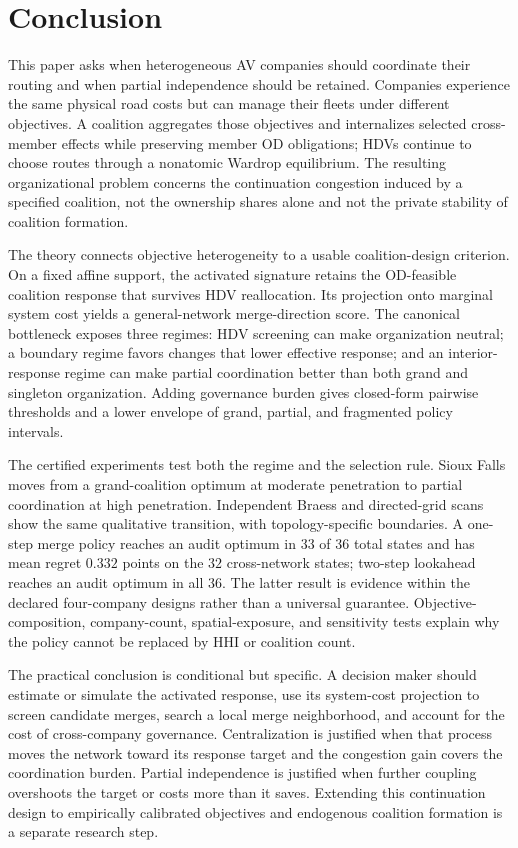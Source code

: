 \section{Conclusion}\label{sec:conclusion}

This paper asks when heterogeneous AV companies should coordinate their
routing and when partial independence should be retained. Companies experience
the same physical road costs but can manage their fleets under different
objectives. A coalition aggregates those objectives and internalizes selected
cross-member effects while preserving member OD obligations; HDVs continue to
choose routes through a nonatomic Wardrop equilibrium. The resulting
organizational problem concerns the continuation congestion induced by a
specified coalition, not the ownership shares alone and not the private
stability of coalition formation.

The theory connects objective heterogeneity to a usable coalition-design
criterion. On a fixed affine support, the activated signature retains the
OD-feasible coalition response that survives HDV reallocation. Its projection
onto marginal system cost yields a general-network merge-direction score. The
canonical bottleneck exposes three regimes: HDV screening can make organization
neutral; a boundary regime favors changes that lower effective response; and
an interior-response regime can make partial coordination better than both
grand and singleton organization. Adding governance burden gives closed-form
pairwise thresholds and a lower envelope of grand, partial, and fragmented
policy intervals.

The certified experiments test both the regime and the selection rule. Sioux
Falls moves from a grand-coalition optimum at moderate penetration to partial
coordination at high penetration. Independent Braess and directed-grid scans
show the same qualitative transition, with topology-specific boundaries. A
one-step merge policy reaches an audit optimum in $33$ of $36$ total states and
has mean regret $0.332$ points on the $32$ cross-network states; two-step
lookahead reaches an audit optimum in all $36$. The latter result is evidence
within the declared four-company designs rather than a universal guarantee.
Objective-composition, company-count, spatial-exposure, and sensitivity tests
explain why the policy cannot be replaced by HHI or coalition count.

The practical conclusion is conditional but specific. A decision maker should
estimate or simulate the activated response, use its system-cost projection to
screen candidate merges, search a local merge neighborhood, and account for
the cost of cross-company governance. Centralization is justified when that
process moves the network toward its response target and the congestion gain
covers the coordination burden. Partial independence is justified when further
coupling overshoots the target or costs more than it saves. Extending this
continuation design to empirically calibrated objectives and endogenous
coalition formation is a separate research step.
